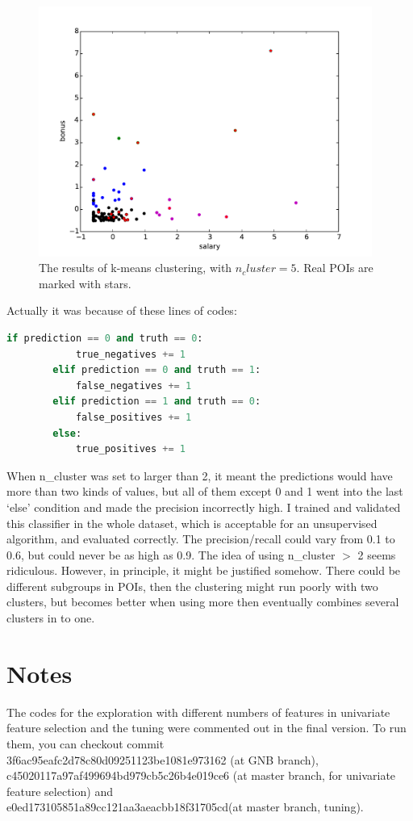 \documentclass[12pt]{article}
\begin{document}
\begin{figure}[!h]
\centering\includegraphics[width=4.3in]{clusters_after_scaling.pdf}
\caption{The results of k-means clustering, with $n_cluster = 5$. Real POIs are marked with stars.}
\end{figure}

Actually it was because of these lines of codes:
\begin{lstlisting}[language=Python,keywordstyle=\color{blue!70},commentstyle=\color{red!50!green!50!blue!50},frame=shadowbox, rulesepcolor=\color{red!20!green!20!blue!20}]
        if prediction == 0 and truth == 0:
            true_negatives += 1
        elif prediction == 0 and truth == 1:
            false_negatives += 1
        elif prediction == 1 and truth == 0:
            false_positives += 1
        else:
            true_positives += 1
\end{lstlisting}
When n\_cluster was set to larger than 2, it meant the predictions would have more than two kinds of values, but all of them except 0 and 1 went into the last `else' condition and made the precision incorrectly high. I trained and validated this classifier in the whole dataset, which is acceptable for an unsupervised algorithm, and evaluated correctly. The precision/recall could vary from 0.1 to 0.6, but could never be as high as 0.9. The idea of using n\_cluster $>$ 2 seems ridiculous. However, in principle, it might be justified somehow. There could be different subgroups in POIs, then the clustering might run poorly with two clusters, but becomes better when using more then eventually combines several clusters in to one.
\section{Notes}
The codes for the exploration with different numbers of features in univariate feature selection and the tuning were commented out in the final version. To run them, you can checkout commit\\
3f6ac95eafc2d78c80d09251123be1081e973162 (at GNB branch),\\
c45020117a97af499694bd979cb5c26b4e019ce6 (at master branch, for univariate feature selection)
and \\
e0ed173105851a89cc121aa3aeacbb18f31705cd(at master branch, tuning).
\end{document}
